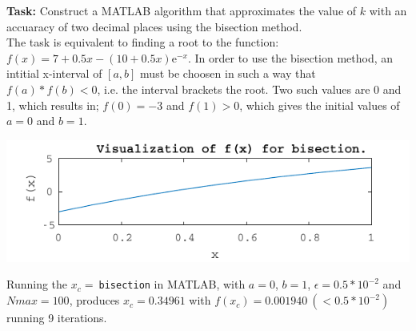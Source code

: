 \documentclass{article}
\begin{document}
  \textbf{Task:}
  Construct a MATLAB algorithm that approximates the value of $k$ with an
  accuaracy of two decimal places using the bisection method. \\

  \noindent
  The task is equivalent to finding a root to the function:
  $ f(x) = 7 + 0.5x - (10 + 0.5x)\mathrm{e}^{-x} $.
  In order to use the bisection method, an intitial x-interval of $[a, b]$ must
  be choosen in such a way that $f(a) * f(b) < 0$, i.e. the interval brackets the
  root. Two such values are 0 and 1, which results in; $f(0) = -3$ and $f(1) >
  0$, which gives the initial values of $a=0$ and $b=1$.

  \begin{center}
    \includegraphics{figs/t3_check.pdf}
  \end{center}

  \noindent
  Running the $x_c =\ $\texttt{bisection} in MATLAB, with $a=0$, $b=1$,
  $\epsilon=0.5*10^{-2}$ and $Nmax=100$, produces $x_c = 0.34961$ with $f(x_c) =
  0.001940 \ ( < 0.5*10^{-2} )$ running 9 iterations.
\end{document}

